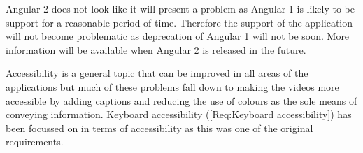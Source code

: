 Angular 2 does not look like it will present a problem as Angular 1 is likely to be support for a reasonable period of time. Therefore the support of the application will not become problematic as deprecation of Angular 1 will not be soon. More information will be available when Angular 2 is released in the future.

Accessibility is a general topic that can be improved in all areas of the applications but much of these problems fall down to making the videos more accessible by adding captions and reducing the use of colours as the sole means of conveying information. Keyboard accessibility (\cref{Req:Keyboard accessibility}) has been focussed on in terms of accessibility as this was one of the original requirements.
